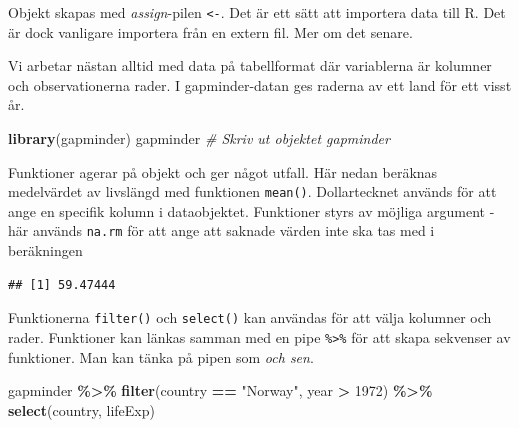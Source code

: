 \documentclass[
]{book}
\newenvironment{Shaded}{\begin{snugshade}}{\end{snugshade}}
\newcommand{\AttributeTok}[1]{\textcolor[rgb]{0.13,0.29,0.53}{#1}}
\newcommand{\CommentTok}[1]{\textcolor[rgb]{0.56,0.35,0.01}{\textit{#1}}}
\newcommand{\DecValTok}[1]{\textcolor[rgb]{0.00,0.00,0.81}{#1}}
\newcommand{\FunctionTok}[1]{\textcolor[rgb]{0.13,0.29,0.53}{\textbf{#1}}}
\newcommand{\NormalTok}[1]{#1}
\newcommand{\SpecialCharTok}[1]{\textcolor[rgb]{0.81,0.36,0.00}{\textbf{#1}}}
\newcommand{\StringTok}[1]{\textcolor[rgb]{0.31,0.60,0.02}{#1}}
\theoremstyle{definition}
\theoremstyle{definition}
\theoremstyle{definition}
\theoremstyle{definition}
\theoremstyle{remark}
\begin{document}
Objekt skapas med \emph{assign}-pilen \texttt{\textless{}-}. Det är ett sätt att importera data till R. Det är dock vanligare importera från en extern fil. Mer om det senare.

Vi arbetar nästan alltid med data på tabellformat där variablerna är kolumner och observationerna rader. I gapminder-datan ges raderna av ett land för ett visst år.

\begin{Shaded}
\begin{Highlighting}[]
\FunctionTok{library}\NormalTok{(gapminder)}
\NormalTok{gapminder                       }\CommentTok{\# Skriv ut objektet gapminder}
\end{Highlighting}
\end{Shaded}

Funktioner agerar på objekt och ger något utfall. Här nedan beräknas medelvärdet av livslängd med funktionen \texttt{mean()}. Dollartecknet används för att ange en specifik kolumn i dataobjektet. Funktioner styrs av möjliga argument - här används \texttt{na.rm} för att ange att saknade värden inte ska tas med i beräkningen

\begin{Shaded}
\end{Shaded}

\begin{verbatim}
## [1] 59.47444
\end{verbatim}

Funktionerna \texttt{filter()} och \texttt{select()} kan användas för att välja kolumner och rader. Funktioner kan länkas samman med en pipe \texttt{\%\textgreater{}\%} för att skapa sekvenser av funktioner. Man kan tänka på pipen som \emph{och sen}.

\begin{Shaded}
\begin{Highlighting}[]
\NormalTok{gapminder }\SpecialCharTok{\%\textgreater{}\%}
  \FunctionTok{filter}\NormalTok{(country }\SpecialCharTok{==} \StringTok{"Norway"}\NormalTok{, year }\SpecialCharTok{\textgreater{}} \DecValTok{1972}\NormalTok{) }\SpecialCharTok{\%\textgreater{}\%}
  \FunctionTok{select}\NormalTok{(country, lifeExp)}
\end{Highlighting}
\end{Shaded}
\end{document}
